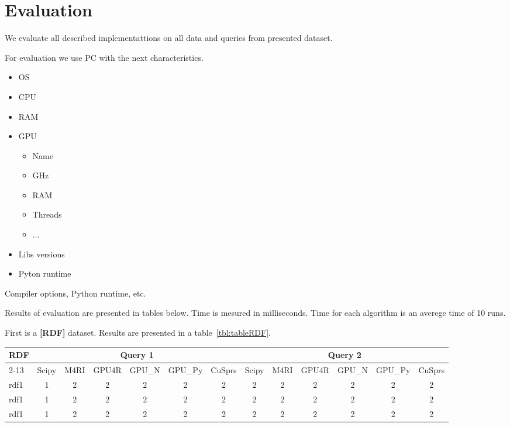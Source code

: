 \section{Evaluation}

We evaluate all described implementattions on all data and queries from presented dataset.

For evaluation we use PC with the next characteristics.
\begin{itemize}
  \item OS
  \item CPU
  \item RAM
  \item GPU
   \begin{itemize}
    \item Name
    \item GHz
    \item RAM
    \item Threads
    \item ...
   \end{itemize}
  \item Libs versions
  \item Pyton runtime
\end{itemize}

Compiler options, Python runtime, etc.

Results of evaluation are presented in tables below.
Time is mesured in milliseconds.
Time for each algorithm is an averege time of 10 runs.

First is a \textbf{[RDF]} dataset. 
Results are presented in a table~\ref{tbl:tableRDF}.

\begin{table*}
\caption{RDFs querying results}
\label{tbl:tableRDF}
\begin{tabular}{| l | c | c | c | c | c | c | c | c | c | c | c | c |}
    \hline
    \multirow{2}{*}{RDF} & \multicolumn{6}{|c|}{Query 1}                               & \multicolumn{6}{|c|}{Query 2} \\ 
    \cline{2-13}
                         & Scipy & M4RI & GPU4R & GPU\_N & GPU\_Py & CuSprs & Scipy & M4RI & GPU4R & GPU\_N & GPU\_Py & CuSprs \\
    \hline
    \hline
    rdf1 & 1 & 2 & 2& 2& 2& 2& 2& 2& 2& 2& 2& 2\\ 
    rdf1 & 1 & 2 & 2& 2& 2& 2& 2& 2& 2& 2& 2& 2\\ 
    rdf1 & 1 & 2 & 2& 2& 2& 2& 2& 2& 2& 2& 2& 2\\ 
    \hline
  \end{tabular}
\end{table*}


